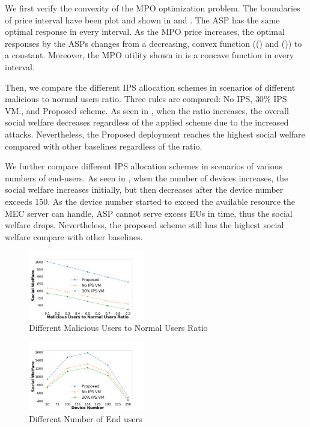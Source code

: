 \documentclass[conference]{IEEEtran}
\begin{document}
We first verify the convexity of the MPO optimization problem. The boundaries of price interval have been plot and shown in  and . The ASP has the same optimal response in every interval. As the MPO price increases, the optimal responses by the ASPs changes from a decreasing, convex function (() and ()) to a constant. Moreover, the MPO utility shown in  is a concave function in every interval. %


Then, we compare the different IPS allocation schemes in scenarios of different malicious to normal users ratio. Three rules are compared: No IPS, $30\%$ IPS VM., and Proposed scheme.  As seen in , when the ratio increases, the overall social welfare decreases regardless of the applied scheme due to the increased attacks. Nevertheless, the Proposed deployment reaches the highest social welfare compared with other baselines regardless of the ratio. 

We further compare different IPS allocation schemes in scenarios of various numbers of end-users. As seen in , when the number of devices increases, the social welfare increases initially, but then decreases after the device number exceeds 150. As the device number started to exceed the available resource the MEC server can handle, ASP cannot serve excess EUs in time, thus the social welfare drops. Nevertheless, the proposed scheme still has the highest social welfare compare with other baselines.

\begin{figure}
    \centering
  \includegraphics[width=0.45\textwidth]{5GDDoS_Game_social_ratio.pdf}
    \caption{Different Malicious Users to Normal Users Ratio}
\vspace{-0.8em}
\label{subfig-1:ratio}
\end{figure}

\begin{figure}
    \centering
  \includegraphics[width=0.45\textwidth]{5GDDoS_Game_social_device.pdf}
\caption{Different Number of End users}
\vspace{-0.8em}
\label{subfig-2:num_cmp}
\end{figure}
\end{document}
